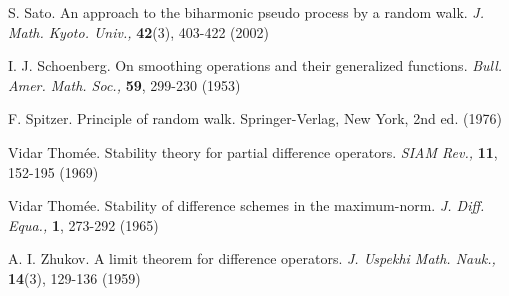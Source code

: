 \documentclass{article}
\theoremstyle{theorem}
\theoremstyle{remark}
\begin{document}
\begin{thebibliography}{99}
 S. Sato. An approach to the biharmonic pseudo process by a random walk. \textit{J. Math. Kyoto. Univ.,} \textbf{42}(3), 403-422 (2002)

 I. J. Schoenberg. On smoothing operations and their generalized
functions. \textit{Bull. Amer. Math. Soc.,} \textbf{59}, 299-230 (1953)

 F. Spitzer. Principle of random walk. Springer-Verlag, New York, 2nd ed. (1976)

 Vidar Thom\'{e}e. Stability theory for partial difference operators. \textit{SIAM Rev.,} \textbf{11}, 152-195  (1969)

 Vidar Thom\'{e}e. Stability of difference schemes in the maximum-norm. \textit{J. Diff. Equa.,} \textbf{1}, 273-292 (1965)

 A. I. Zhukov. A limit theorem for difference operators. \textit{J. Uspekhi Math. Nauk.,} \textbf{14}(3), 129-136 (1959)














\end{thebibliography}
\end{document}
